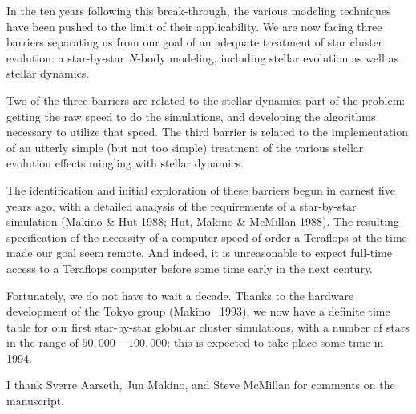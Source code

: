 In the ten years following this break-through, the various modeling
techniques have been pushed to the limit of their applicability.  We
are now facing three barriers separating us from our goal of an
adequate treatment of star cluster evolution: a star-by-star $N$-body
modeling, including stellar evolution as well as stellar dynamics.

Two of the three barriers are related to the stellar dynamics part of
the problem: getting the raw speed to do the simulations, and
developing the algorithms necessary to utilize that speed.  The third
barrier is related to the implementation of an utterly simple (but not
too simple) treatment of the various stellar evolution effects
mingling with stellar dynamics.

The identification and initial exploration of these barriers begun in
earnest five years ago, with a detailed analysis of the requirements
of a star-by-star simulation (Makino \& Hut 1988; Hut, Makino \&
McMillan 1988).  The resulting specification of the necessity of a 
computer speed of order a Teraflops at the time made our goal seem
remote.  And indeed, it is unreasonable to expect full-time access to
a Teraflops computer before some time early in the next century.

Fortunately, we do not have to wait a decade.  Thanks to the hardware
development of the Tokyo group (Makino \etal\ 1993), we now have a
definite time table for our first star-by-star globular cluster
simulations, with a number of stars in the range of $50,000$ --
$100,000$: this is expected to take place some time in 1994.

\acknowledgments
I thank Sverre Aarseth, Jun Makino, and Steve McMillan for comments on
the manuscript.

